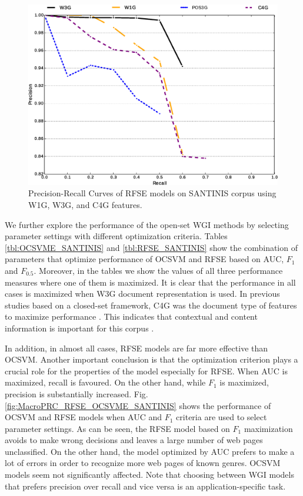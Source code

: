 \begin{figure}[H]
\begin{center}
    \includegraphics[scale=0.38]{diagrams/RFSE_Best_per_DocRep.eps}
	\caption{Precision-Recall Curves of RFSE models on SANTINIS corpus using W1G, W3G, and C4G features.}
	\label{fig:MacroPRC_RFSE_W3G_W1G_C4G_OPTIMAL_SANTINIS}
	\end{center}
\end{figure}

We further explore the performance of the open-set WGI methods by selecting parameter settings with different optimization criteria. Tables \ref{tbl:OCSVME_SANTINIS} and \ref{tbl:RFSE_SANTINIS} show the combination of parameters that optimize performance of OCSVM and RFSE based on AUC, $F_{1}$ and $F_{0.5}$. Moreover, in the tables we show the values of all three performance measures where one of them is maximized. It is clear that the performance in all cases is maximized when W3G document representation is used. In previous studies based on a closed-set framework, C4G was the document type of features to maximize performance \citep{Sharroff2010}. This indicates that contextual and content information is important for this corpus \citep{Asheghi2015}.

In addition, in almost all cases, RFSE models are far more effective than OCSVM. Another important conclusion is that the optimization criterion plays a crucial role for the properties of the model especially for RFSE. When AUC is maximized, recall is favoured. On the other hand, while $F_{1}$ is maximized, precision is substantially increased. Fig.  \ref{fig:MacroPRC_RFSE_OCSVME_SANTINIS} shows the performance of OCSVM and RFSE models when AUC and $F_{1}$ criteria are used to select parameter settings. As can be seen, the RFSE model based on $F_{1}$ maximization avoids to make wrong decisions and leaves a large number of web pages unclassified. On the other hand, the model optimized by AUC prefers to make a lot of errors in order to recognize more web pages of known genres. OCSVM models seem not significantly affected. Note that choosing between WGI models that prefers precision over recall and vice versa is an application-specific task.

